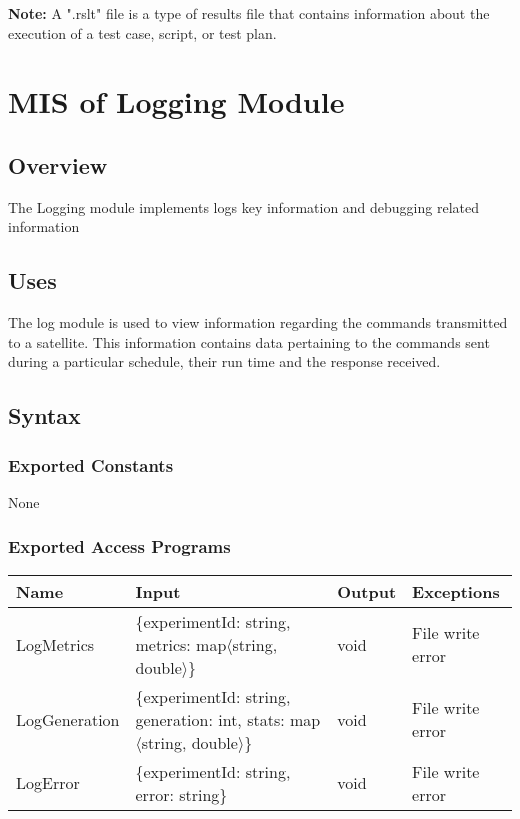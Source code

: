 \documentclass[12pt, titlepage]{article}
\begin{document}
\textbf{Note:} A ".rslt" file is a type of results file that contains information about the execution of a test case, script, or test plan.

\section{MIS of Logging Module} \label{Module}

\subsection{ Overview}

The Logging module implements logs key information and debugging related information
\subsection{ Uses}

The log module is used to view information regarding the commands transmitted to a satellite. This information contains data pertaining to the commands sent during a particular schedule, their run time and the response received. 

\subsection{ Syntax}

\subsubsection{ Exported Constants}
None

\subsubsection{Exported Access Programs}
\begin{center}
  \begin{tabular}{p{3cm} p{5cm} p{2.5cm} p{2.5cm}}
    \hline
    \textbf{Name} & \textbf{Input} & \textbf{Output} & \textbf{Exceptions} \\
    \hline
    LogMetrics & \{experimentId: string, metrics: map$\langle$string, double$\rangle$\} & void & File write error \\
    \hline
    LogGeneration & \{experimentId: string, generation: int, stats: map$\langle$string, double$\rangle$\} & void & File write error \\
    \hline
    LogError & \{experimentId: string, error: string\} & void & File write error \\
    \hline
  \end{tabular}
\end{center}
\end{document}
